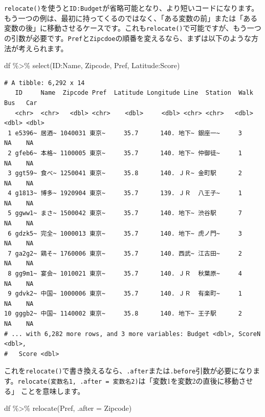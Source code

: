 \documentclass[
  a4paper,
  pandoc,
  ja=standard,
  jafont=haranoaji]{bxjsbook}
\newenvironment{Shaded}{\begin{snugshade}}{\end{snugshade}}
\newcommand{\AttributeTok}[1]{\textcolor[rgb]{0.00,0.48,0.65}{#1}}
\newcommand{\FunctionTok}[1]{\textcolor[rgb]{0.28,0.35,0.67}{#1}}
\newcommand{\NormalTok}[1]{\textcolor[rgb]{0.00,0.48,0.65}{#1}}
\newcommand{\SpecialCharTok}[1]{\textcolor[rgb]{0.37,0.37,0.37}{#1}}
\begin{document}
\texttt{relocate()}を使うと\texttt{ID:Budget}が省略可能となり、より短いコードになります。もう一つの例は、最初に持ってくるのではなく、「ある変数の前」または「ある変数の後」に移動させるケースです。これも\texttt{relocate()}で可能ですが、もう一つの引数が必要です。\texttt{Pref}と\texttt{Zipcdoe}の順番を変えるなら、まずは以下のような方法が考えられます。

\begin{Shaded}
\begin{Highlighting}[numbers=left,,]
\NormalTok{df }\SpecialCharTok{\%\textgreater{}\%}
  \FunctionTok{select}\NormalTok{(ID}\SpecialCharTok{:}\NormalTok{Name, Zipcode, Pref, Latitude}\SpecialCharTok{:}\NormalTok{Score)}
\end{Highlighting}
\end{Shaded}

\begin{verbatim}
# A tibble: 6,292 x 14
   ID     Name  Zipcode Pref  Latitude Longitude Line  Station  Walk   Bus   Car
   <chr>  <chr>   <dbl> <chr>    <dbl>     <dbl> <chr> <chr>   <dbl> <dbl> <dbl>
 1 e5396~ 居酒~ 1040031 東京~     35.7      140. 地下~ 銀座一~     3    NA    NA
 2 gfeb6~ 本格~ 1100005 東京~     35.7      140. 地下~ 仲御徒~     1    NA    NA
 3 ggt59~ 食べ~ 1250041 東京~     35.8      140. ＪＲ~ 金町駅      2    NA    NA
 4 g1813~ 博多~ 1920904 東京~     35.7      139. ＪＲ  八王子~     1    NA    NA
 5 ggww1~ まさ~ 1500042 東京~     35.7      140. 地下~ 渋谷駅      7    NA    NA
 6 gdzk5~ 完全~ 1000013 東京~     35.7      140. 地下~ 虎ノ門~     3    NA    NA
 7 ga2g2~ 鶏そ~ 1760006 東京~     35.7      140. 西武~ 江古田~     2    NA    NA
 8 gg9m1~ 宴会~ 1010021 東京~     35.7      140. ＪＲ  秋葉原~     4    NA    NA
 9 gdvk2~ 中国~ 1000006 東京~     35.7      140. ＪＲ  有楽町~     1    NA    NA
10 gggb2~ 中国~ 1140002 東京~     35.8      140. 地下~ 王子駅      2    NA    NA
# ... with 6,282 more rows, and 3 more variables: Budget <dbl>, ScoreN <dbl>,
#   Score <dbl>
\end{verbatim}

これを\texttt{relocate()}で書き換えるなら、\texttt{.after}または\texttt{.before}引数が必要になります。\texttt{relocate(変数名1,\ .after\ =\ 変数名2)}は「変数1を変数2の直後に移動させる」
ことを意味します。

\begin{Shaded}
\begin{Highlighting}[numbers=left,,]
\NormalTok{df }\SpecialCharTok{\%\textgreater{}\%}
  \FunctionTok{relocate}\NormalTok{(Pref, }\AttributeTok{.after =}\NormalTok{ Zipcode)}
\end{Highlighting}
\end{Shaded}
\end{document}
